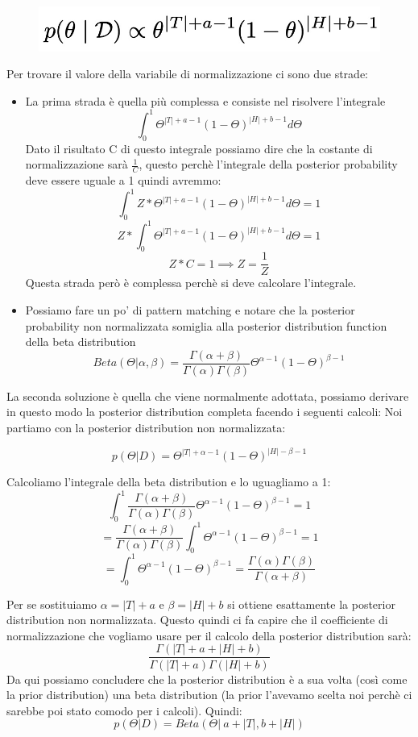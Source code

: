 \documentclass[14pt]{extreport}
\begin{document}
\begin{figure}[H]
\centering
\includegraphics[width=0.7\linewidth]{45.jpeg}
\end{figure}

Per trovare il valore della variabile di normalizzazione ci sono due strade:
\begin{itemize}
\item La prima strada è quella più complessa e consiste nel risolvere l'integrale $$\int_0^1 \Theta^{|T|+a-1} (1-\Theta)^{|H|+b-1} d\Theta$$ Dato il
risultato C di questo integrale possiamo dire che la costante di normalizzazione sarà $\frac{1}{C}$, questo perchè l'integrale della posterior
probability deve essere uguale a 1 quindi avremmo: $$\int_0^1 Z * \Theta^{|T|+a-1} (1-\Theta)^{|H|+b-1} d\Theta = 1$$ $$Z*\int_0^1 \Theta^{|T|+a-1}
(1-\Theta)^{|H|+b-1} d\Theta = 1$$ $$Z*C = 1 \implies Z = \frac{1}{Z} $$	Questa strada però è complessa perchè si deve calcolare l'integrale.
\item Possiamo fare un po' di pattern matching e notare che la posterior probability non normalizzata somiglia alla posterior distribution function
della beta distribution
$$Beta(\Theta | \alpha, \beta) = \frac{\Gamma(\alpha + \beta)}{\Gamma(\alpha)\Gamma(\beta)}\Theta^{\alpha-1}(1-\Theta)^{\beta-1}$$
\end{itemize}

La seconda soluzione è quella che viene normalmente adottata, possiamo derivare in questo modo la posterior distribution completa facendo i seguenti
calcoli: Noi partiamo con la posterior distribution non normalizzata:

$$p(\Theta | D) = \Theta^{|T| +\alpha-1}(1-\Theta)^{|H|-\beta-1}$$

Calcoliamo l'integrale della beta distribution e lo uguagliamo a 1:
$$\int_0^1\frac{\Gamma(\alpha + \beta)}{\Gamma(\alpha)\Gamma(\beta)}\Theta^{\alpha-1}(1-\Theta)^{\beta-1} = 1$$
$$= \frac{\Gamma(\alpha + \beta)}{\Gamma(\alpha)\Gamma(\beta)}\int_0^1\Theta^{\alpha-1}(1-\Theta)^{\beta-1} = 1$$
$$= \int_0^1\Theta^{\alpha-1}(1-\Theta)^{\beta-1} = \frac{\Gamma(\alpha)\Gamma(\beta)}{\Gamma(\alpha + \beta)}$$

Per se sostituiamo $\alpha = |T|+a$ e $\beta = |H|+b$ si ottiene esattamente la posterior distribution non normalizzata. Questo quindi ci fa capire
che il coefficiente di normalizzazione che vogliamo usare per il calcolo della posterior distribution sarà:
$$\frac{\Gamma(|T|+a + |H|+b)}{\Gamma(|T|+a)\Gamma(|H|+b)}$$ Da qui possiamo concludere che la posterior distribution è a sua volta (così come la
prior distribution) una beta distribution (la prior l'avevamo scelta noi perchè ci sarebbe poi stato comodo per i calcoli). Quindi: $$p(\Theta|D) =
Beta(\Theta|\ a+|T|, b+|H|)$$
\end{document}
